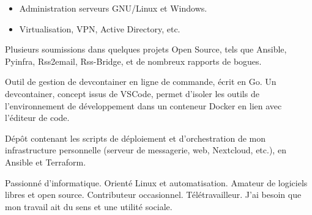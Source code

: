 \documentclass[10pt,a4paper,ragged2e,withhyper]{altacv}
\begin{document}
\begin{paracol}{2}
\divider

\begin{itemize}
    \item Administration serveurs GNU/Linux et Windows.
    \item Virtualisation, VPN, Active Directory, etc.
\end{itemize}

\newpage


Plusieurs soumissions dans quelques projets Open Source, tels que Ansible, Pyinfra, Rss2email, Rss-Bridge, et de nombreux rapports de bogues.

\divider

Outil de gestion de devcontainer en ligne de commande, écrit en Go. Un devcontainer, concept issus de VSCode, permet d'isoler les outils de l'environnement de développement dans un conteneur Docker en lien avec l'éditeur de code.

\divider

Dépôt contenant les scripts de déploiement et d'orchestration de mon infrastructure personnelle (serveur de messagerie, web, Nextcloud, etc.), en Ansible et Terraform.

\medskip

\switchcolumn


Passionné d'informatique. Orienté Linux et automatisation. Amateur de logiciels libres et open source. Contributeur occasionnel. Télétravailleur. J'ai besoin que mon travail ait du sens et une utilité sociale.



\medskip




\end{paracol}
\end{document}
